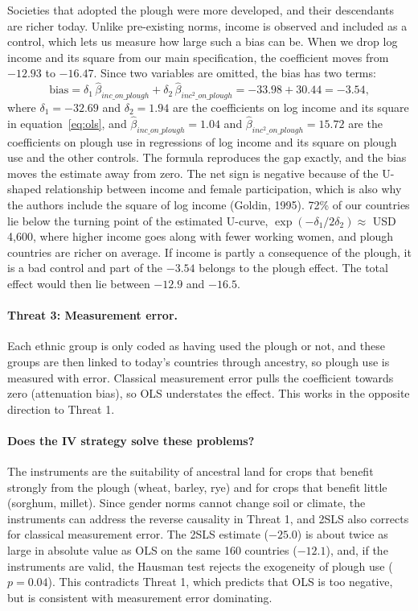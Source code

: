 \documentclass[11pt,a4paper]{article}
\begin{document}
Societies that adopted the plough were more developed, and their descendants are richer today. Unlike pre-existing norms, income is observed and included as a control, which lets us measure how large such a bias can be. When we drop log income and its square from our main specification, the coefficient moves from $-12.93$ to $-16.47$. Since two variables are omitted, the bias has two terms:
\[
\text{bias} = \delta_1 \, \hat\beta_{inc\_on\_plough} + \delta_2 \, \hat\beta_{inc^2\_on\_plough} = -33.98 + 30.44 = -3.54 ,
\]
where $\delta_1 = -32.69$ and $\delta_2 = 1.94$ are the coefficients on log income and its square in equation~\eqref{eq:ols}, and $\hat\beta_{inc\_on\_plough} = 1.04$ and $\hat\beta_{inc^2\_on\_plough} = 15.72$ are the coefficients on plough use in regressions of log income and its square on plough use and the other controls. The formula reproduces the gap exactly, and the bias moves the estimate away from zero. The net sign is negative because of the U-shaped relationship between income and female participation, which is also why the authors include the square of log income (Goldin, 1995). 72\% of our countries lie below the turning point of the estimated U-curve, $\exp(-\delta_1 / 2\delta_2) \approx$ USD 4,600, where higher income goes along with fewer working women, and plough countries are richer on average. If income is partly a consequence of the plough, it is a bad control and part of the $-3.54$ belongs to the plough effect. The total effect would then lie between $-12.9$ and $-16.5$.

\paragraph{Threat 3: Measurement error.}

Each ethnic group is only coded as having used the plough or not, and these groups are then linked to today's countries through ancestry, so plough use is measured with error. Classical measurement error pulls the coefficient towards zero (attenuation bias), so OLS understates the effect. This works in the opposite direction to Threat 1.

\paragraph{Does the IV strategy solve these problems?}

The instruments are the suitability of ancestral land for crops that benefit strongly from the plough (wheat, barley, rye) and for crops that benefit little (sorghum, millet). Since gender norms cannot change soil or climate, the instruments can address the reverse causality in Threat 1, and 2SLS also corrects for classical measurement error. The 2SLS estimate ($-25.0$) is about twice as large in absolute value as OLS on the same 160 countries ($-12.1$), and, if the instruments are valid, the Hausman test rejects the exogeneity of plough use ($p = 0.04$). This contradicts Threat 1, which predicts that OLS is too negative, but is consistent with measurement error dominating.
\end{document}
